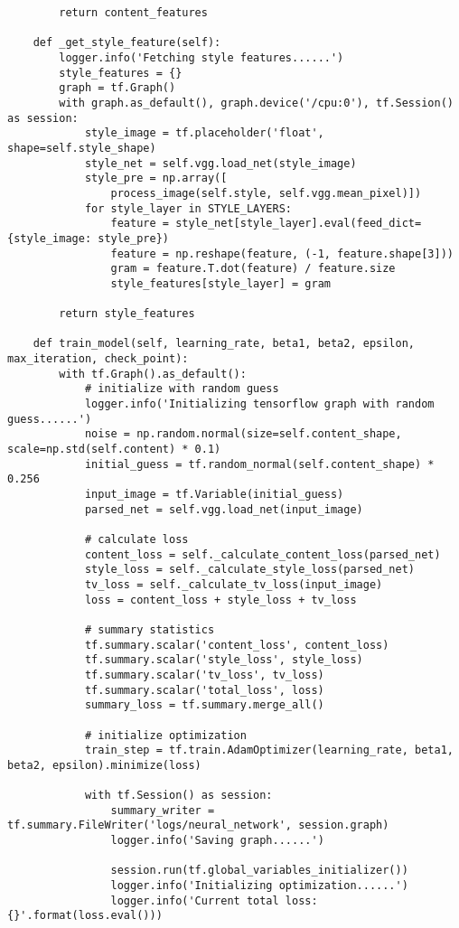 \begin{spacing}{1.2}
\begin{lstlisting}
        return content_features

    def _get_style_feature(self):
        logger.info('Fetching style features......')
        style_features = {}
        graph = tf.Graph()
        with graph.as_default(), graph.device('/cpu:0'), tf.Session() as session:
            style_image = tf.placeholder('float', shape=self.style_shape)
            style_net = self.vgg.load_net(style_image)
            style_pre = np.array([
                process_image(self.style, self.vgg.mean_pixel)])
            for style_layer in STYLE_LAYERS:
                feature = style_net[style_layer].eval(feed_dict={style_image: style_pre})
                feature = np.reshape(feature, (-1, feature.shape[3]))
                gram = feature.T.dot(feature) / feature.size
                style_features[style_layer] = gram

        return style_features

    def train_model(self, learning_rate, beta1, beta2, epsilon, max_iteration, check_point):
        with tf.Graph().as_default():
            # initialize with random guess
            logger.info('Initializing tensorflow graph with random guess......')
            noise = np.random.normal(size=self.content_shape, scale=np.std(self.content) * 0.1)
            initial_guess = tf.random_normal(self.content_shape) * 0.256
            input_image = tf.Variable(initial_guess)
            parsed_net = self.vgg.load_net(input_image)

            # calculate loss
            content_loss = self._calculate_content_loss(parsed_net)
            style_loss = self._calculate_style_loss(parsed_net)
            tv_loss = self._calculate_tv_loss(input_image)
            loss = content_loss + style_loss + tv_loss

            # summary statistics
            tf.summary.scalar('content_loss', content_loss)
            tf.summary.scalar('style_loss', style_loss)
            tf.summary.scalar('tv_loss', tv_loss)
            tf.summary.scalar('total_loss', loss)
            summary_loss = tf.summary.merge_all()

            # initialize optimization
            train_step = tf.train.AdamOptimizer(learning_rate, beta1, beta2, epsilon).minimize(loss)

            with tf.Session() as session:
                summary_writer = tf.summary.FileWriter('logs/neural_network', session.graph)
                logger.info('Saving graph......')

                session.run(tf.global_variables_initializer())
                logger.info('Initializing optimization......')
                logger.info('Current total loss: {}'.format(loss.eval()))


\end{lstlisting}
\end{spacing}
